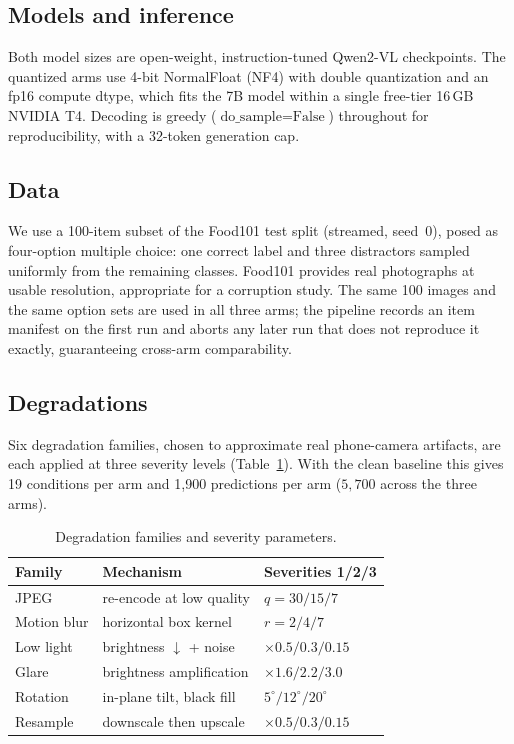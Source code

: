 \documentclass[11pt]{article}
\begin{document}
\subsection{Models and inference}
Both model sizes are open-weight, instruction-tuned Qwen2-VL checkpoints. The
quantized arms use 4-bit NormalFloat (NF4) with double quantization and an
fp16 compute dtype, which fits the 7B model within a single free-tier
16\,GB NVIDIA T4. Decoding is greedy ($\text{do\_sample}=\text{False}$)
throughout for reproducibility, with a 32-token generation cap.

\subsection{Data}
We use a 100-item subset of the Food101 test split \citep{bossard2014food}
(streamed, seed~0), posed as four-option multiple choice: one correct label and
three distractors sampled uniformly from the remaining classes. Food101 provides
real photographs at usable resolution, appropriate for a corruption study. The
same 100 images and the same option sets are used in all three arms; the
pipeline records an item manifest on the first run and aborts any later run that
does not reproduce it exactly, guaranteeing cross-arm comparability.

\subsection{Degradations}
Six degradation families, chosen to approximate real phone-camera artifacts, are
each applied at three severity levels (Table~\ref{tab:deg}). With the clean
baseline this gives 19 conditions per arm and 1{,}900 predictions per
arm ($5{,}700$ across the three arms).

\begin{table}[t]
\centering
\small
\begin{tabular}{@{}lll@{}}
\toprule
Family & Mechanism & Severities 1/2/3 \\
\midrule
JPEG        & re-encode at low quality        & $q=30/15/7$ \\
Motion blur & horizontal box kernel           & $r=2/4/7$ \\
Low light   & brightness $\downarrow$ + noise & $\times0.5/0.3/0.15$ \\
Glare       & brightness amplification        & $\times1.6/2.2/3.0$ \\
Rotation    & in-plane tilt, black fill       & $5^{\circ}/12^{\circ}/20^{\circ}$ \\
Resample    & downscale then upscale          & $\times0.5/0.3/0.15$ \\
\bottomrule
\end{tabular}
\caption{Degradation families and severity parameters.}
\label{tab:deg}
\end{table}
\end{document}
